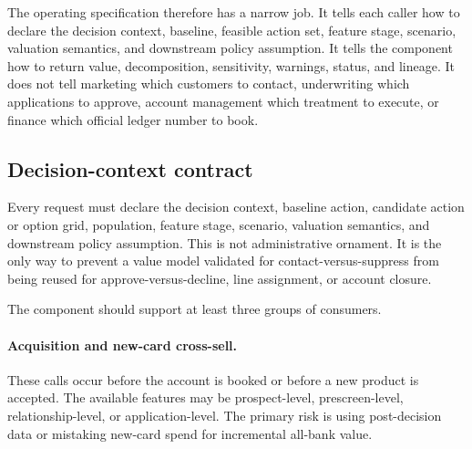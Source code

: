 \documentclass[11pt]{article}
\newcommand{\1}{\mathbf{1}}
\begin{document}
The operating specification therefore has a narrow job. It tells each caller
how to declare the decision context, baseline, feasible action set, feature
stage, scenario, valuation semantics, and downstream policy assumption. It
tells the component how to return value, decomposition, sensitivity, warnings,
status, and lineage. It does not tell marketing which customers to contact,
underwriting which applications to approve, account management which treatment
to execute, or finance which official ledger number to book.

\subsection{Decision-context contract}
\label{subsec:decision-context-contract}

Every request must declare the decision context, baseline action, candidate
action or option grid, population, feature stage, scenario, valuation semantics,
and downstream policy assumption. This is not administrative ornament. It is
the only way to prevent a value model validated for contact-versus-suppress
from being reused for approve-versus-decline, line assignment, or account
closure.

The component should support at least three groups of consumers.

\paragraph{Acquisition and new-card cross-sell.}
These calls occur before the account is booked or before a new product is
accepted. The available features may be prospect-level, prescreen-level,
relationship-level, or application-level. The primary risk is using
post-decision data or mistaking new-card spend for incremental all-bank value.
\end{document}
